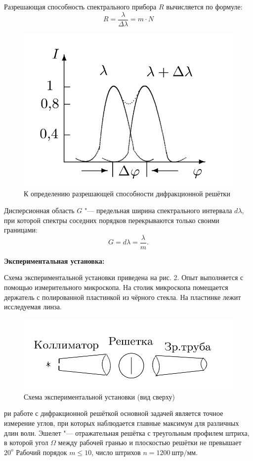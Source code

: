 \documentclass[a4paper, 12pt]{article}%
\begin{document}
	
	Разрешающая способность спектрального прибора $R$ вычисляется по формуле:
\begin{equation}
	R = \frac{\lambda}{\Delta \lambda} = m \cdot N
\end{equation}
	\begin{figure}[H]
		\begin{center}
			\includegraphics[width = 0.5\linewidth]{k.png}
			\caption{К определению разрешающей способности дифракционной решётки}
		\end{center}
		
	\end{figure}
	Дисперсионная область $G$ "--- предельная ширина спектрального интервала $d \lambda$, при которой спектры соседних порядков перекрываются только своими границами:
\begin{equation}
	G = d \lambda = \frac{\lambda}{m}.
\end{equation}
	
	\textbf{Экспериментальная установка:}
	
	Схема экспериментальной установки приведена на рис. 2. Опыт выполняется с помощью измерительного микроскопа.
	На столик микроскопа помещается держатель с полированной пластинкой из
	чёрного стекла. На пластинке лежит исследуемая линза.
	
	\begin{figure}[H]
		\begin{center}
			\includegraphics[width=0.6\linewidth]{ust.png}
			\caption{Схема экспериментальной установки (вид сверху)}
		\end{center}
	\end{figure}
	
	ри работе с дифракционной решёткой основной задачей является точное измерение углов, при которых наблюдается главные максимум для различных длин волн.
	Эшелет "--- отражательная решётка с  треугольным профилем штриха, в которой угол $\Omega$ между рабочей гранью и плоскостью решётки не превышает $20^o$
	Рабочий порядок $m \leq 10$, число штрихов $n = 1200\ штр/мм$.
	
\end{document}
